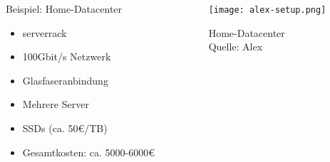 \documentclass[
    ngerman,
    accentcolor=3b,
    fontsize= 12pt,
    a4paper,
    aspectratio=169,
    colorback=true,
    fancy_row_colors,
    leqno,
    fleqn,
    boxarc=3pt,
    fleqn,
    main,
    design=2008,
]{algoslides}
\begin{document}
    \begin{frame}
        \slidehead{}
        \begin{columns}[T]
            \begin{column}{.5\textwidth}
                Beispiel: Home-Datacenter
                \begin{itemize}
                    \item serverrack
                    \item 100Gbit/s Netzwerk
                    \item Glasfaseranbindung
                    \item Mehrere Server
                    \item SSDs (ca. 50€/TB)
                    \item Gesamtkosten: ca. 5000-6000€
                \end{itemize}
            \end{column}%
            \begin{column}{.5\textwidth}
                \begin{figure}[ht!]
                    \centering
                    \texttt{[image: alex-setup.png]}
                    \caption{Home-Datacenter\\Quelle: Alex}
                    \label{fig:home-datacenter}
                \end{figure}
            \end{column}%
        \end{columns}
    \end{frame}
\end{document}
